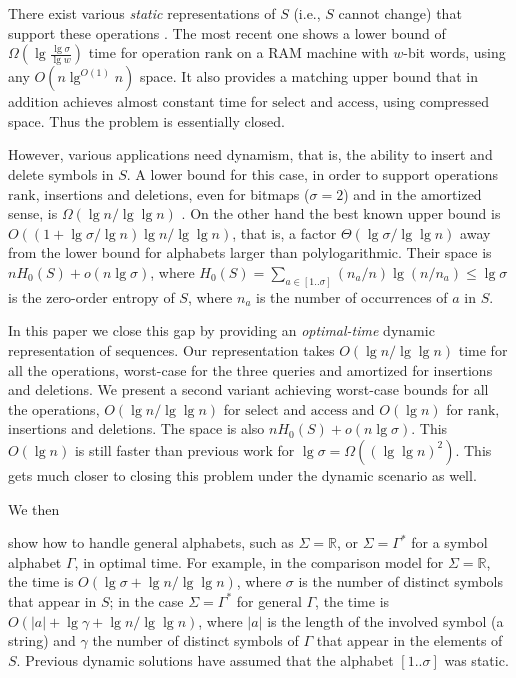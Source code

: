 \documentclass[11pt]{article}
\def\idrm#1{\ensuremath{\mathrm{#1}}}
\newcommand{\no}[1]{}
\newcommand{\ra}{\idrm{rank}}
\newcommand{\sel}{\idrm{select}}
\newcommand{\acc}{\idrm{access}}
\begin{document}
There exist various {\em static} representations of $S$ (i.e., $S$ cannot change) that support these 
operations \cite{GGV03,GMR06,FMMN07,BGNN10,BN12}. The most recent one
\cite{BN12} shows a lower bound of $\Omega(\lg\frac{\lg\sigma}{\lg w})$ time
for operation $\ra$ on a RAM machine with $w$-bit words, using any
$O(n \lg^{O(1)} n)$ space. It also provides a matching upper bound that in addition 
achieves almost constant time for $\sel$ and $\acc$, using compressed space. 
Thus the problem is essentially closed.

However, various applications need dynamism, that is, the ability to insert and 
delete symbols in $S$. A lower bound for this case, in order to support
operations $\ra$, insertions and deletions, even for bitmaps ($\sigma=2$) and
in the amortized sense, is $\Omega(\lg n /\lg\lg n)$ \cite{FS89}. On the other
hand the best known upper bound \cite{HM10,NS10} is 
$O((1+\lg\sigma/\lg n)\lg n /\lg\lg n)$, that is, a factor 
$\Theta(\lg\sigma/\lg\lg n)$ away from the lower bound for
alphabets larger than polylogarithmic. Their space is $nH_0(S)+o(n\lg\sigma)$,
where $H_0(S) = \sum_{a \in [1..\sigma]} (n_a/n) \lg(n/n_a) \le \lg\sigma$
is the zero-order entropy of $S$, where $n_a$ is the number of occurrences of 
$a$ in $S$. 

In this paper we close this gap by providing an {\em optimal-time} dynamic
representation of sequences. Our representation takes $O(\lg n /\lg\lg n)$
time for all the operations, worst-case for the three queries and amortized
for insertions and deletions. We present a second variant achieving worst-case
bounds for all the operations, $O(\lg n /\lg\lg n)$ for $\sel$ and $\acc$
and $O(\lg n)$ for $\ra$, insertions and deletions. The space is also
$nH_0(S)+o(n\lg\sigma)$. This $O(\lg n)$ is still faster than previous
work for $\lg\sigma = \Omega((\lg\lg n)^2)$. This gets much closer to
closing this problem under the dynamic scenario as well.

We then 
\no{consider some extensions of our results. First, we }
show how to 
handle general alphabets, such as $\Sigma= \mathbb{R}$, or 
$\Sigma=\Gamma^*$ for a symbol alphabet $\Gamma$, in optimal time. 
For example, in the comparison model for $\Sigma=\mathbb{R}$,
the time is $O(\lg\sigma+\lg n / \lg\lg n)$, where $\sigma$ is the number of 
distinct symbols that appear in $S$; in the case $\Sigma=\Gamma^*$ for 
general $\Gamma$, the time is $O(|a|+\lg\gamma + \lg n / \lg\lg n)$, where
$|a|$ is the length of the involved symbol (a string) and $\gamma$ the number of distinct 
symbols of $\Gamma$ that appear in the elements of $S$.
Previous dynamic solutions have assumed that the alphabet
$[1..\sigma]$ was static.
\end{document}
